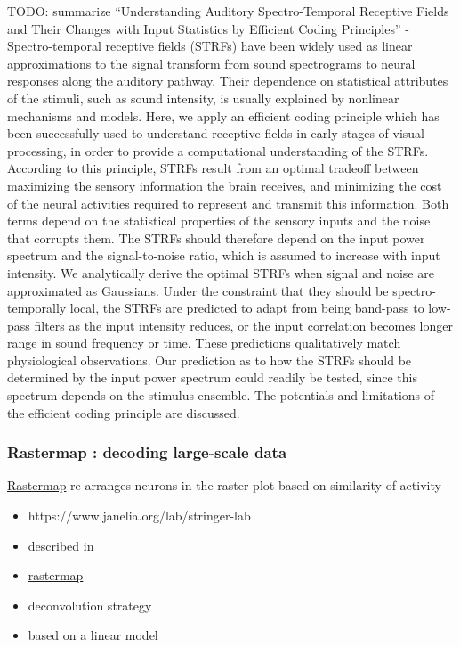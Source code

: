 \documentclass[brainsci, %
               review,submit,pdftex,moreauthors]{Definitions/mdpi}
\begin{document}
TODO: summarize ``Understanding Auditory Spectro-Temporal Receptive Fields and Their Changes with Input Statistics by Efficient Coding Principles'' - Spectro-temporal receptive fields (STRFs) have been widely used as linear approximations to the signal transform from sound spectrograms to neural responses along the auditory pathway. Their dependence on statistical attributes of the stimuli, such as sound intensity, is usually explained by nonlinear mechanisms and models. Here, we apply an efficient coding principle which has been successfully used to understand receptive fields in early stages of visual processing, in order to provide a computational understanding of the STRFs. According to this principle, STRFs result from an optimal tradeoff between maximizing the sensory information the brain receives, and minimizing the cost of the neural activities required to represent and transmit this information. Both terms depend on the statistical properties of the sensory inputs and the noise that corrupts them. The STRFs should therefore depend on the input power spectrum and the signal-to-noise ratio, which is assumed to increase with input intensity. We analytically derive the optimal STRFs when signal and noise are approximated as Gaussians. Under the constraint that they should be spectro-temporally local, the STRFs are predicted to adapt from being band-pass to low-pass filters as the input intensity reduces, or the input correlation becomes longer range in sound frequency or time. These predictions qualitatively match physiological observations. Our prediction as to how the STRFs should be determined by the input power spectrum could readily be tested, since this spectrum depends on the stimulus ensemble. The potentials and limitations of the efficient coding principle are discussed.
~\citep{zhao_understanding_2011}

\subsubsection{Rastermap : decoding large-scale data}\label{rastermap-decoding-large-scale-data}
\href{https://nbviewer.org/github/MouseLand/rastermap/blob/master/tutorial/tutorial.ipynb}{Rastermap} re-arranges neurons in the raster plot based on similarity of activity

\begin{itemize}
 \item
  https://www.janelia.org/lab/stringer-lab
\item
  described in~\citep{pachitariu_robustness_2018}
\item
  \href{https://github.com/MouseLand/rastermap}{rastermap}
\item
  deconvolution strategy
\item
  based on a linear model
\end{itemize}
\end{document}
